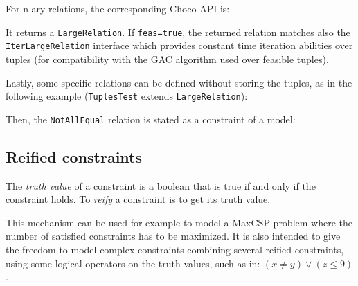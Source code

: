 For n-ary relations, the corresponding Choco API is:\\

It returns a \texttt{LargeRelation}. If \texttt{feas=true}, the returned relation matches also the \texttt{IterLargeRelation} interface which provides constant time iteration abilities over tuples (for compatibility with the GAC algorithm used over feasible tuples).


Lastly, some specific relations can be defined without storing the tuples, as in the following example (\texttt{TuplesTest} extends \texttt{LargeRelation}):

Then, the \texttt{NotAllEqual} relation is stated as a constraint of a model:




\subsection{Reified constraints}\label{model:reifiedconstraints}\hypertarget{model:reifiedconstraints}{}
The \emph{truth value} of a constraint is a boolean that is true if and only if the constraint holds.
To \emph{reify} a constraint is to get its truth value. 

This mechanism can be used for example to model a MaxCSP problem where the number of satisfied constraints has to be maximized.
It is also intended to give the freedom to model complex constraints combining several reified constraints, using some logical operators on the truth values, such as in:
$(x \neq y) \lor (z \le 9)$.

